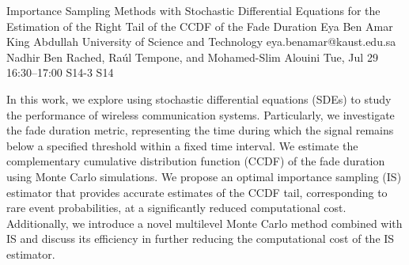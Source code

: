 \documentclass[12pt,lettersize,oneside]{book} %
\begin{document}
\begin{talk}
  {Importance Sampling Methods with Stochastic Differential Equations for the Estimation of the Right Tail of the CCDF of the Fade Duration}%
  {Eya Ben Amar}%
  {King Abdullah University of Science and Technology}%
  {eya.benamar@kaust.edu.sa}%
  {Nadhir Ben Rached, Ra\'ul Tempone, and Mohamed-Slim Alouini}%
  {}%
  {Tue, Jul 29 16:30--17:00}%
  {S14-3}%
  {S14}%
  
    
In this work, we explore using stochastic differential equations (SDEs) to study the performance of wireless communication systems. Particularly, we investigate the fade duration metric, representing the time during which the signal remains below a specified threshold within a fixed time interval. We estimate the complementary cumulative distribution function (CCDF) of the fade duration using Monte Carlo simulations. We propose an optimal importance sampling (IS) estimator that provides accurate estimates of the CCDF tail, corresponding to rare event probabilities, at a significantly reduced computational cost. Additionally, we introduce a novel multilevel Monte Carlo method combined with IS and discuss its efficiency in further reducing the computational cost of the IS estimator.
\medskip

\end{talk}
\end{document}
